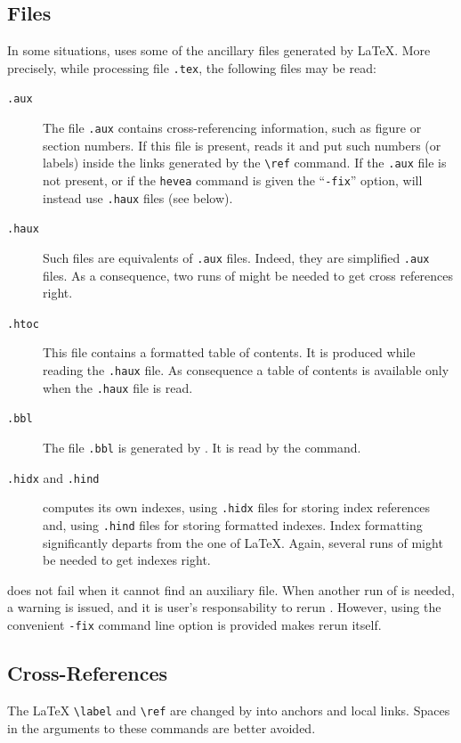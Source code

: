 \subsection{Files}\label{files}
In some situations,
\hevea{} uses some of the ancillary files generated by \LaTeX.
More precisely, while processing file \texttt{.tex},
the following files may be read:
\begin{description}
\item[\protect\texttt{.aux}] The file \texttt{.aux} contains
cross-referencing information, such as figure or section numbers.
If this file is present, \hevea{} reads it and put such numbers (or
labels) inside
the links generated by the \verb+\ref+ command. If the \texttt{.aux}
file is not present, or if the \texttt{hevea} command is given the
``\texttt{-fix}'' option, \hevea{} will instead use \texttt{.haux}
files (see below).
\item[\protect\texttt{.haux}] Such files are \hevea{} equivalents of
\texttt{.aux} files. Indeed, they are simplified \texttt{.aux} files.
As a consequence, two runs of \hevea{} might be needed to get cross
references right.
\item[\protect\texttt{.htoc}] This file contains a formatted table of
contents. It is produced while reading the \texttt{.haux} file.
As consequence a table of contents is available only when the
\texttt{.haux} file is read.


\item[\protect\texttt{.bbl}] The file \texttt{.bbl} is generated by
\BibTeX{}. It is read by the \verb++ command.

\item[\protect\texttt{.hidx} and \protect\texttt{.hind}]
\hevea{} computes its own indexes, using \texttt{.hidx} files for
storing index references and, using \texttt{.hind} files
for storing formatted indexes.
Index formatting significantly departs from the one of \LaTeX{}.
Again, several runs of \hevea{} might be needed to get indexes right.
\end{description}

\noindent\hevea{} does not fail when it cannot find an auxiliary file.
When another run of \hevea{} is needed, a warning is issued,
and it is user's responsability to rerun \hevea{}.
However, using the convenient \texttt{-fix} command line option is
provided makes \hevea{} rerun itself.

\subsection{Cross-References}\label{cross}
The \LaTeX{} \verb+\label+ and \verb+\ref+ are changed by \hevea{}
into {\html} anchors and local links.
Spaces in the arguments to these commands are better avoided.


